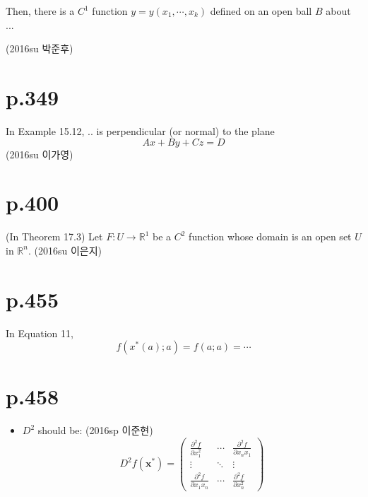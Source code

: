 \documentclass[a4paper]{article}
\begin{document}
Then, there is a $C^1$ function $y=y(x_1,\cdots,x_k)$ defined on an open ball $B$ about ...

(2016su 박준후)

\section{p.349} %
\label{sec:p_349}
In Example 15.12, .. is perpendicular (or normal) to the plane\[
	Ax+By+Cz=D
\](2016su 이가영)

\section{p.400} %
\label{sec:p_400}
(In Theorem 17.3) Let $F:U\rightarrow \mathbb{R}^1$ be a $C^2$ function whose domain is an open set $U$ in $\mathbb{R}^n$.
(2016su 이은지)

\section{p.455} %
\label{sec:p_455}
In Equation 11, \[
	f(x^\ast(a);a)=f(a;a)= \cdots
\]

\section{p.458} %
\label{sec:p_458}

\begin{itemize}
	\item $D^2$ should be: (2016sp 이준현)
	\[
		D^2 f(\mathbf{x^\ast}) = \begin{pmatrix}
			\frac{\partial^2 f}{\partial x_1^2} & \cdots & \frac{\partial^2 f}{\partial x_nx_1}\\
			\vdots & \ddots & \vdots \\
			\frac{\partial^2 f}{\partial x_1x_n} & \cdots & \frac{\partial^2 f}{\partial x_n^2}
		\end{pmatrix}
	\]
\end{itemize}

\end{document}

